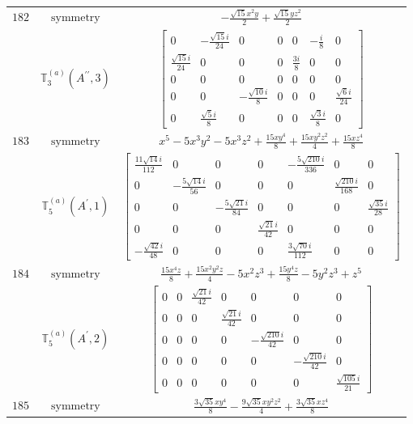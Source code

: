 \documentclass[fleqn,8pt,landscape]{jsarticle}
\begin{document}
\begin{longtable}{ccc}
$ 182 $ & $ \text{symmetry} $ & $ - \frac{\sqrt{15} x^{2} y}{2} + \frac{\sqrt{15} y z^{2}}{2} $ \\
$  $ & $ \mathbb{T}_{3}^{(a)}(A^{\prime\prime},3) $ & $ \begin{bmatrix} 0 & - \frac{\sqrt{15} i}{24} & 0 & 0 & 0 & - \frac{i}{8} & 0 \\ \frac{\sqrt{15} i}{24} & 0 & 0 & 0 & \frac{3 i}{8} & 0 & 0 \\ 0 & 0 & 0 & 0 & 0 & 0 & 0 \\ 0 & 0 & - \frac{\sqrt{10} i}{8} & 0 & 0 & 0 & \frac{\sqrt{6} i}{24} \\ 0 & \frac{\sqrt{5} i}{8} & 0 & 0 & 0 & \frac{\sqrt{3} i}{8} & 0 \end{bmatrix} $ \\ \hline
$ 183 $ & $ \text{symmetry} $ & $ x^{5} - 5 x^{3} y^{2} - 5 x^{3} z^{2} + \frac{15 x y^{4}}{8} + \frac{15 x y^{2} z^{2}}{4} + \frac{15 x z^{4}}{8} $ \\
$  $ & $ \mathbb{T}_{5}^{(a)}(A^{\prime},1) $ & $ \begin{bmatrix} \frac{11 \sqrt{14} i}{112} & 0 & 0 & 0 & - \frac{5 \sqrt{210} i}{336} & 0 & 0 \\ 0 & - \frac{5 \sqrt{14} i}{56} & 0 & 0 & 0 & \frac{\sqrt{210} i}{168} & 0 \\ 0 & 0 & - \frac{5 \sqrt{21} i}{84} & 0 & 0 & 0 & \frac{\sqrt{35} i}{28} \\ 0 & 0 & 0 & \frac{\sqrt{21} i}{42} & 0 & 0 & 0 \\ - \frac{\sqrt{42} i}{48} & 0 & 0 & 0 & \frac{3 \sqrt{70} i}{112} & 0 & 0 \end{bmatrix} $ \\ \hline
$ 184 $ & $ \text{symmetry} $ & $ \frac{15 x^{4} z}{8} + \frac{15 x^{2} y^{2} z}{4} - 5 x^{2} z^{3} + \frac{15 y^{4} z}{8} - 5 y^{2} z^{3} + z^{5} $ \\
$  $ & $ \mathbb{T}_{5}^{(a)}(A^{\prime},2) $ & $ \begin{bmatrix} 0 & 0 & \frac{\sqrt{21} i}{42} & 0 & 0 & 0 & 0 \\ 0 & 0 & 0 & \frac{\sqrt{21} i}{42} & 0 & 0 & 0 \\ 0 & 0 & 0 & 0 & - \frac{\sqrt{210} i}{42} & 0 & 0 \\ 0 & 0 & 0 & 0 & 0 & - \frac{\sqrt{210} i}{42} & 0 \\ 0 & 0 & 0 & 0 & 0 & 0 & \frac{\sqrt{105} i}{21} \end{bmatrix} $ \\ \hline
$ 185 $ & $ \text{symmetry} $ & $ \frac{3 \sqrt{35} x y^{4}}{8} - \frac{9 \sqrt{35} x y^{2} z^{2}}{4} + \frac{3 \sqrt{35} x z^{4}}{8} $ \\

\end{longtable}
\end{document}
